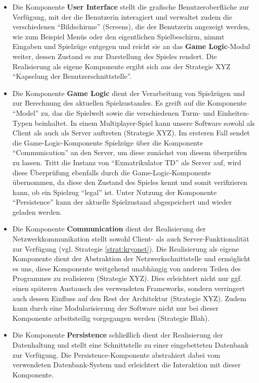 \documentclass[enabledeprecatedfontcommands,fontsize=12pt,paper=a4,twoside,parskip=half]{scrartcl}
\begin{document}
\begin{itemize}
    \item Die Komponente \textbf{User Interface} stellt die grafische Benutzeroberfläche zur Verfügung, mit der die Benutzerin interagiert und verwaltet zudem die verschiedenen \enquote{Bildschirme} (Screens), die der Benutzerin angezeigt werden, wie zum Beispiel Menüs oder den eigentlichen Spielbeschirm, nimmt Eingaben und Spielzüge entgegen und reicht sie an das \textbf{Game Logic}-Modul weiter, dessen Zustand es zur Darstellung des Spieles rendert. Die Realisierung als eigene Komponente ergibt sich aus der Strategie XYZ \enquote{Kapselung der Benutzerschnittstelle}.
    \item Die Komponente \textbf{Game Logic} dient der Verarbeitung von Spielzügen und zur Berechnung des aktuellen Spielzustandes. Es greift auf die Komponente \enquote{Model} zu, das die Spielwelt sowie die verschiedenen Turm- und Einheiten-Typen beinhaltet. In einem Multiplayer-Spiel kann unsere Software sowohl als Client als auch als Server auftreten (Strategie XYZ). Im ersteren Fall sendet die Game-Logic-Komponente Spielzüge über die Komponente \enquote{Communication} an den Server, um diese zunächst von diesem überprüfen zu lassen. Tritt die Instanz von \enquote{Exmatrikulator TD} als Server auf, wird diese Überprüfung ebenfalls durch die Game-Logic-Komponente übernommen, da diese den Zustand des Spieles kennt und somit verifizieren kann, ob ein Spielzug \enquote{legal} ist. Unter Nutzung der Komponente \enquote{Persistence} kann der aktuelle Spielzustand abgespeichert und wieder geladen werden.
    \item Die Komponente \textbf{Communication} dient der Realisierung der Netzwerkkommunikation stellt sowohl Client- als auch Server-Funktionalität zur Verfügung (vgl. Strategie \ref{strat:kryonet}). Die Realisierung als eigene Komponente dient der Abstraktion der Netzwerkschnittstelle und ermöglicht es uns, diese Komponente weitgehend unabhängig von anderen Teilen des Programmes zu realisieren (Strategie XYZ). Dies erleichtert nicht nur ggf. einen späteren Austausch des verwendeten Frameworks, sondern verringert auch dessen Einfluss auf den Rest der Architektur (Strategie XYZ). Zudem kann durch eine Modularisierung der Software nicht nur bei dieser Komponente arbeitsteilig vorgegangen werden (Strategie Blah).
    \item Die Komponente \textbf{Persistence} schließlich dient der Realisierung der Datenhaltung und stellt eine Schnittstelle zu einer eingebetteten Datenbank zur Verfügung. Die Persistence-Komponente abstrahiert dabei vom verwendeten Datenbank-System und erleichtert die Interaktion mit dieser Komponente.
\end{itemize}
\end{document}
